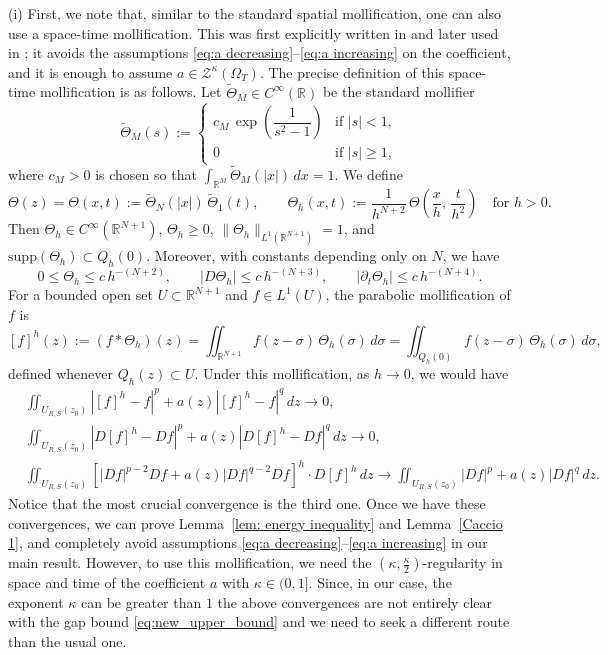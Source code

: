 \documentclass[10pt,a4paper]{amsart}
\numberwithin{equation}{section}
\newcommand{\RR}{\mathds{R}}
\begin{document}
(i) First, we note that, similar to the standard spatial mollification, one can also use a space-time mollification. This was first explicitly written in \cite{OSS2025} and later used in \cite{HOK25, kimkimoh2026}; 
it avoids the assumptions \eqref{eq:a decreasing}--\eqref{eq:a increasing} on the coefficient, 
and it is enough to assume $a\in \mathcal{Z}^{\kappa}(\Omega_T)$. The precise definition of this space-time mollification is as follows. Let $\widetilde{\Theta}_M \in C^\infty(\RR)$ be the 
standard mollifier
\[
  \widetilde{\Theta}_M(s) :=
  \begin{cases}
    c_M\, \exp\!\left(\dfrac{1}{s^{2} - 1}\right) & \text{if } |s| < 1,\\[2mm]
    0 & \text{if } |s| \ge 1,
  \end{cases}
\]
where $c_M > 0$ is chosen so that
$\int_{\RR^M} \widetilde{\Theta}_M(|x|)\, dx = 1$. We define
\[
  \Theta(z) = \Theta(x, t)
        := \widetilde{\Theta}_N(|x|)\, \widetilde{\Theta}_1(t),
  \qquad
  \Theta_h(x, t)
        := \frac{1}{h^{N+2}}\, \Theta\!\left(\frac{x}{h},\, \frac{t}{h^{2}}\right)
  \quad \text{for } h > 0.
\]
Then $\Theta_h \in C^\infty(\RR^{N+1})$, $\Theta_h \ge 0$,
$\|\Theta_h\|_{L^1(\RR^{N+1})} = 1$, and
$\mathrm{supp}(\Theta_h) \subset Q_h(0)$. Moreover, with constants
depending only on $N$, we have
\[
  0 \le \Theta_h \le c\, h^{-(N+2)},
  \qquad
  |D\Theta_h| \le c\, h^{-(N+3)},
  \qquad
  |\partial_t \Theta_h| \le c\, h^{-(N+4)}.
\]
For a bounded open set $U \subset \RR^{N+1}$ and $f \in L^1(U)$, the
parabolic mollification of $f$ is
\[
  [f]^{h}(z)
  := (f * \Theta_h)(z)
  = \iint_{\RR^{N+1}} f(z - \sigma)\, \Theta_h(\sigma)\, d\sigma
  = \iint_{Q_h(0)} f(z - \sigma)\, \Theta_h(\sigma)\, d\sigma,
\]
defined whenever $Q_h(z) \subset U$. Under this mollification, as 
$h \to 0$, we would have
\begin{align*}
    &\iint_{U_{R, S}(z_0)}|[f]^h-f|^p+a(z)|[f]^h-f|^q\, dz\to 0,\\
    &\iint_{U_{R, S}(z_0)}|D[f]^h-Df|^p+a(z)|D[f]^h-Df|^q\, dz\to 0, \\
    &\iint_{U_{R, S}(z_0)}\left[|Df|^{p-2}Df+a(z)|Df|^{q-2}Df\right]^h\cdot D[f]^h\,dz\to \iint_{U_{R, S}(z_0)}|Df|^p+a(z)|Df|^q\,dz.
\end{align*}
Notice that the most crucial convergence is the third one. Once we 
have these convergences, we can prove 
Lemma~\ref{lem: energy inequality} and Lemma~\ref{Caccio 1}, and 
completely avoid assumptions  \eqref{eq:a decreasing}--\eqref{eq:a increasing} in our main result. However, to use this mollification, we need the  $(\kappa, \frac{\kappa}{2} )$-regularity in space and time of the coefficient $a$ with  $\kappa \in (0, 1].$ Since, in our case, the exponent $\kappa$ can be greater than $1$ the above convergences are not entirely clear with the gap bound \eqref{eq:new_upper_bound} and we need to seek a different route than the usual one.
\end{document}

